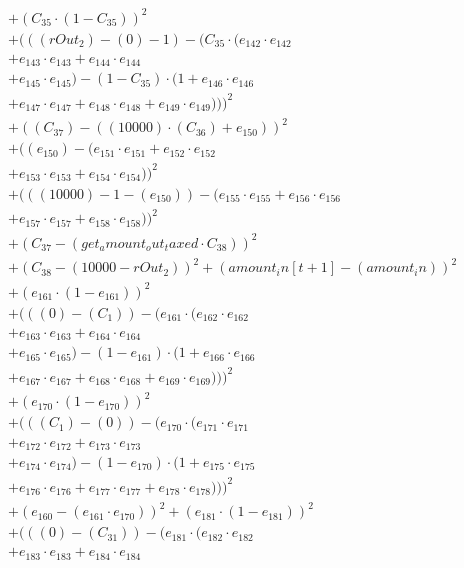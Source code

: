 \documentclass[10pt, a4paper]{article}
\begin{document}
\begin{align*}
& + (C_{35} \cdot (1 - C_{35}))^{2} \\
& + (((rOut_2) - (0) - 1) - (C_{35} \cdot (e_{142} \cdot e_{142} \\
& + e_{143} \cdot e_{143} + e_{144} \cdot e_{144} \\
& + e_{145} \cdot e_{145}) - (1 - C_{35}) \cdot (1 + e_{146} \cdot e_{146} \\
& + e_{147} \cdot e_{147} + e_{148} \cdot e_{148} + e_{149} \cdot e_{149})))^{2} \\
& + ((C_{37}) - ((10000)  \cdot  (C_{36}) + e_{150}))^{2} \\
& + ((e_{150}) - (e_{151} \cdot e_{151} + e_{152} \cdot e_{152} \\
& + e_{153} \cdot e_{153} + e_{154} \cdot e_{154}))^{2} \\
& + (((10000) - 1 - (e_{150})) - (e_{155} \cdot e_{155} + e_{156} \cdot e_{156} \\
& + e_{157} \cdot e_{157} + e_{158} \cdot e_{158}))^{2} \\
& + (C_{37} - (get_amount_out_taxed  \cdot  C_{38}))^{2} \\
& + (C_{38} - (10000 - rOut_2))^{2} + (amount_in[t+1] - (amount_in))^{2} \\
& + (e_{161} \cdot (1 - e_{161}))^{2} \\
& + (((0) - (C_{1})) - (e_{161} \cdot (e_{162} \cdot e_{162} \\
& + e_{163} \cdot e_{163} + e_{164} \cdot e_{164} \\
& + e_{165} \cdot e_{165}) - (1 - e_{161}) \cdot (1 + e_{166} \cdot e_{166} \\
& + e_{167} \cdot e_{167} + e_{168} \cdot e_{168} + e_{169} \cdot e_{169})))^{2} \\
& + (e_{170} \cdot (1 - e_{170}))^{2} \\
& + (((C_{1}) - (0)) - (e_{170} \cdot (e_{171} \cdot e_{171} \\
& + e_{172} \cdot e_{172} + e_{173} \cdot e_{173} \\
& + e_{174} \cdot e_{174}) - (1 - e_{170}) \cdot (1 + e_{175} \cdot e_{175} \\
& + e_{176} \cdot e_{176} + e_{177} \cdot e_{177} + e_{178} \cdot e_{178})))^{2} \\
& + (e_{160} - (e_{161} \cdot e_{170}))^{2} + (e_{181} \cdot (1 - e_{181}))^{2} \\
& + (((0) - (C_{31})) - (e_{181} \cdot (e_{182} \cdot e_{182} \\
& + e_{183} \cdot e_{183} + e_{184} \cdot e_{184} \\

\end{align*}
\end{document}
